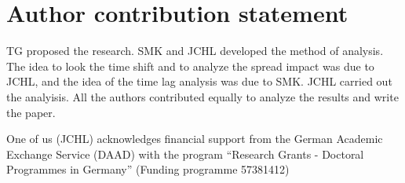 \section{Author contribution statement}

TG proposed the research. SMK and JCHL developed the method of analysis.
The idea to look the time shift and to analyze the spread impact was due to
JCHL, and the idea of the time lag analysis was due to SMK. JCHL carried out
the analyisis. All the authors contributed equally to analyze the results and
write the paper.

\begin{acknowledgement}
    One of us (JCHL) acknowledges financial support from the German
    Academic Exchange Service (DAAD) with
    the program ``Research Grants - Doctoral Programmes in Germany''
    (Funding programme 57381412)
\end{acknowledgement}
